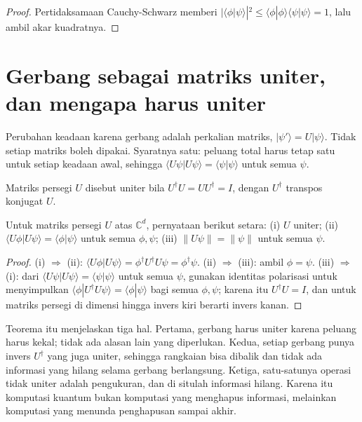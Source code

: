 \begin{proof}
Pertidaksamaan Cauchy-Schwarz memberi
$|\langle\phi|\psi\rangle|^2\le\langle\phi|\phi\rangle\langle\psi|\psi\rangle=1$, lalu
ambil akar kuadratnya.
\end{proof}

\section{Gerbang sebagai matriks uniter, dan mengapa harus uniter}

Perubahan keadaan karena gerbang adalah perkalian matriks, $|\psi'\rangle=U|\psi\rangle$.
Tidak setiap matriks boleh dipakai. Syaratnya satu: peluang total harus tetap satu untuk
setiap keadaan awal, sehingga
$\langle U\psi|U\psi\rangle=\langle\psi|\psi\rangle$ untuk semua $\psi$.

\begin{definisi}
Matriks persegi $U$ disebut uniter bila $U^{\dagger}U=UU^{\dagger}=I$, dengan
$U^{\dagger}$ transpos konjugat $U$.
\end{definisi}

\begin{teorema}
Untuk matriks persegi $U$ atas $\mathbb{C}^{d}$, pernyataan berikut setara: (i) $U$
uniter; (ii) $\langle U\phi|U\psi\rangle=\langle\phi|\psi\rangle$ untuk semua $\phi,\psi$;
(iii) $\|U\psi\|=\|\psi\|$ untuk semua $\psi$.
\end{teorema}

\begin{proof}
(i) $\Rightarrow$ (ii): $\langle U\phi|U\psi\rangle=\phi^{\dagger}U^{\dagger}U\psi
=\phi^{\dagger}\psi$. (ii) $\Rightarrow$ (iii): ambil $\phi=\psi$. (iii)
$\Rightarrow$ (i): dari $\langle U\psi|U\psi\rangle=\langle\psi|\psi\rangle$ untuk semua
$\psi$, gunakan identitas polarisasi untuk menyimpulkan
$\langle\phi|U^{\dagger}U\psi\rangle=\langle\phi|\psi\rangle$ bagi semua $\phi,\psi$;
karena itu $U^{\dagger}U=I$, dan untuk matriks persegi di dimensi hingga invers kiri
berarti invers kanan.
\end{proof}

Teorema itu menjelaskan tiga hal. Pertama, gerbang harus uniter karena peluang harus
kekal; tidak ada alasan lain yang diperlukan. Kedua, setiap gerbang punya invers
$U^{\dagger}$ yang juga uniter, sehingga rangkaian bisa dibalik dan tidak ada informasi
yang hilang selama gerbang berlangsung. Ketiga, satu-satunya operasi tidak uniter adalah
pengukuran, dan di situlah informasi hilang. Karena itu komputasi kuantum bukan
komputasi yang menghapus informasi, melainkan komputasi yang menunda penghapusan sampai
akhir.

